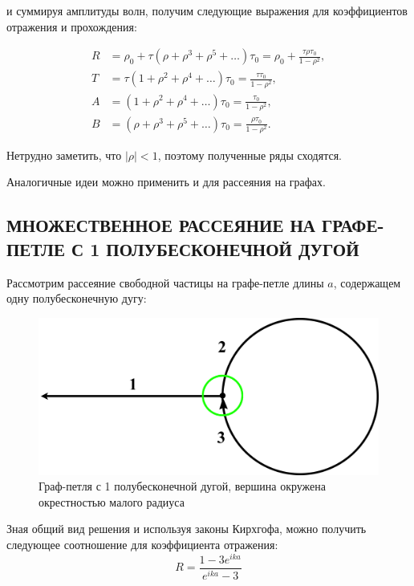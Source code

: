 \documentclass[a4 paper, 12 pt]{extarticle}
\begin{document}
   и суммируя амплитуды волн, получим следующие выражения для коэффициентов отражения и прохождения:
   
   \[
   \begin{aligned}
   R&=\rho_0+\tau(\rho+\rho^3+\rho^5+\ldots)\tau_0=\rho_0+\frac{\tau\rho\tau_0}{1-\rho^2},\\
   T&=\tau(1+\rho^2+\rho^4+\ldots)\tau_0=\frac{\tau\tau_0}{1-\rho^2}, \\
   A&=(1+\rho^2+\rho^4+\ldots)\tau_0=\frac{\tau_0}{1-\rho^2}, \\
   B&=(\rho+\rho^3+\rho^5+\ldots)\tau_0=\frac{\rho\tau_0}{1-\rho^2}.   
   \end{aligned}\]
   
   Нетрудно заметить, что $|\rho|<1$, поэтому полученные ряды сходятся.   
   
   Аналогичные идеи можно применить и для рассеяния на графах.
   
   \subsection{МНОЖЕСТВЕННОЕ РАССЕЯНИЕ НА ГРАФЕ-ПЕТЛЕ С 1 ПОЛУБЕСКОНЕЧНОЙ ДУГОЙ}
   
   Рассмотрим рассеяние свободной частицы на графе-петле длины $a$, содержащем одну полубесконечную дугу:
   
   \begin{figure}[!htb]
   	\centering
   	\includegraphics[scale=0.05]{circle1.jpg}
    \caption{Граф-петля с 1 полубесконечной дугой, вершина окружена окрестностью малого радиуса}
   \end{figure}
   
   Зная общий вид решения и используя законы Кирхгофа, можно получить следующее соотношение для коэффициента отражения:
   \begin{equation}
   \label{multiplyReflection1}
   R = \frac{1-3e^{ika}}{e^{ika}-3}
   \end{equation}
   
\end{document}
